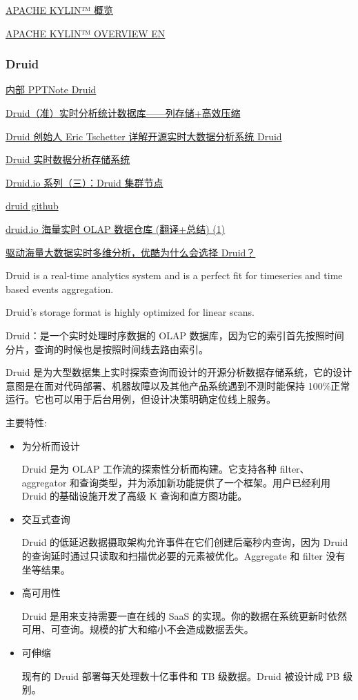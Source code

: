\documentclass[hyperref, UTF-8]{ctexart}
\begin{document}
\href{http://kylin.apache.org/cn/}{APACHE KYLIN™ 概览}  

\href{http://kylin.apache.org/cn/}{APACHE KYLIN™ OVERVIEW EN}
\subsubsection{Druid}
\label{sec:org260574b}
\hyperref[orgbd98af0]{内部 PPTNote Druid}

\href{http://www.cnblogs.com/bonelee/p/6248172.html}{Druid（准）实时分析统计数据库——列存储+高效压缩}   

\href{http://www.csdn.net/article/2014-10-30/2822381/2}{Druid 创始人 Eric Tschetter 详解开源实时大数据分析系统 Druid}  

\href{http://www.open-open.com/lib/view/open1447637905900.html}{Druid 实时数据分析存储系统}   

\href{https://www.2cto.com/database/201610/560087.html}{Druid.io 系列（三）：Druid 集群节点}    

\href{https://github.com/druid-io/druid}{druid github}  

\href{http://www.cnblogs.com/lpthread/p/4519687.html}{druid.io 海量实时 OLAP 数据仓库 (翻译+总结) (1)}

\href{http://www.raincent.com/content-85-7091-1.html}{驱动海量大数据实时多维分析，优酷为什么会选择 Druid？}

Druid is a real-time analytics system and is a perfect fit for timeseries and time based events aggregation.  

Druid's storage format is highly optimized for linear scans.  

Druid：是一个实时处理时序数据的 OLAP 数据库，因为它的索引首先按照时间分片，查询的时候也是按照时间线去路由索引。

Druid 是为大型数据集上实时探索查询而设计的开源分析数据存储系统，它的设计意图是在面对代码部署、机器故障以及其他产品系统遇到不测时能保持 100\%正常运行。它也可以用于后台用例，但设计决策明确定位线上服务。

主要特性:
\begin{itemize}
\item 为分析而设计

Druid 是为 OLAP 工作流的探索性分析而构建。它支持各种 filter、aggregator 和查询类型，并为添加新功能提供了一个框架。用户已经利用 Druid 的基础设施开发了高级 K 查询和直方图功能。
\item 交互式查询

Druid 的低延迟数据摄取架构允许事件在它们创建后毫秒内查询，因为 Druid 的查询延时通过只读取和扫描优必要的元素被优化。Aggregate 和 filter 没有坐等结果。
\item 高可用性

Druid 是用来支持需要一直在线的 SaaS 的实现。你的数据在系统更新时依然可用、可查询。规模的扩大和缩小不会造成数据丢失。
\item 可伸缩

现有的 Druid 部署每天处理数十亿事件和 TB 级数据。Druid 被设计成 PB 级别。
\end{itemize}
\end{document}
